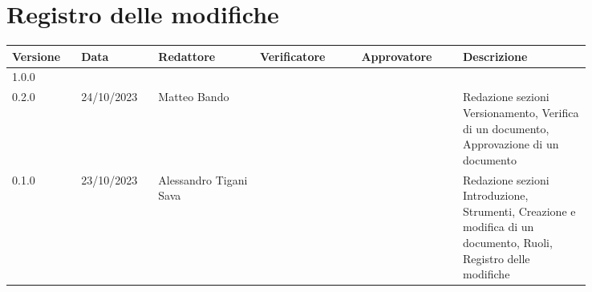 \section*{Registro delle modifiche}
{
\renewcommand{\arraystretch}{1.5}
\scriptsize
\begin{tabular}{p{0.10\linewidth}p{0.10\linewidth}p{0.15\linewidth}p{0.15\linewidth}p{0.15\linewidth}p{0.19\linewidth}}
    \textbf{Versione}   & \textbf{Data} & \textbf{Redattore}        & \textbf{Verificatore} & \textbf{Approvatore}  & \textbf{Descrizione}  \\
    \hline
    1.0.0 \\
    \hline
    0.2.0               & 24/10/2023    & Matteo Bando              &                       &                       & Redazione sezioni Versionamento, Verifica di un documento, Approvazione di un documento   \\
    \hline
    0.1.0               & 23/10/2023    & Alessandro Tigani Sava    &                       &                       & Redazione sezioni Introduzione, Strumenti, Creazione e modifica di un documento, Ruoli, Registro delle modifiche \\
    \hline
\end{tabular}
}